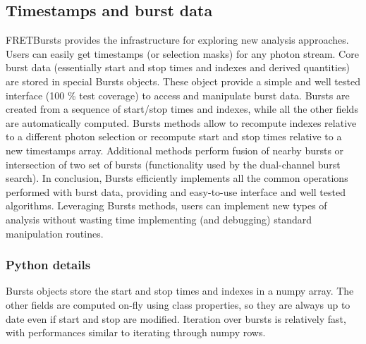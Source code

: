 \subsection{Timestamps and burst data}
\label{sec:burststimes}

FRETBursts provides the infrastructure for exploring new analysis approaches.
Users can easily get timestamps (or selection masks) for any photon stream.
Core burst data (essentially start and stop times and indexes 
and derived quantities) are stored in special Bursts objects.
These object provide a simple and well tested interface (100 \% test coverage) 
to access and manipulate burst data. Bursts are created from a sequence of start/stop 
times and indexes, while all the other fields are automatically
computed. Bursts methods allow to recompute indexes relative to a different photon
selection or recompute start and stop times relative to a new timestamps array.
Additional methods perform fusion of nearby bursts or intersection of two set
of bursts (functionality used by the dual-channel burst search).
In conclusion, Bursts efficiently implements all the common operations performed 
with burst data, providing and easy-to-use interface and well tested algorithms. 
Leveraging Bursts methods, users can implement new types of analysis without 
wasting time implementing (and debugging) standard manipulation routines.

\subsubsection{Python details}
Bursts objects store the start and stop times and indexes in a numpy array.
The other fields are computed on-fly using class properties, so they are always
up to date even if start and stop are modified. Iteration over bursts is
relatively fast, with performances similar to iterating through numpy rows.

